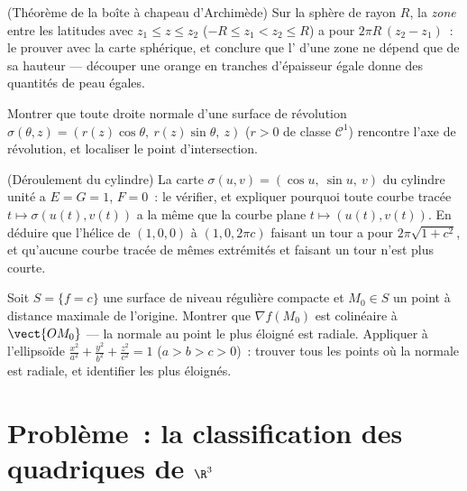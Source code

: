 \begin{exercise}[$\star$]\label{exo:b2:surfaces:9}
(Théorème de la boîte à chapeau d'Archimède) Sur la sphère de
rayon $R$, la \emph{zone} entre les latitudes avec $z_1 \leq z \leq z_2$
($-R \leq z_1 < z_2 \leq R$) a pour  $2\pi R\,(z_2 - z_1)$~:
le prouver avec la carte sphérique, et conclure que l' d'une
zone ne dépend que de sa hauteur --- découper une orange en
tranches d'épaisseur égale donne des quantités de peau égales.
\end{exercise}

\begin{exercise}[$\star\star$]\label{exo:b2:surfaces:10}
Montrer que toute droite normale d'une surface de révolution
$\sigma(\theta, z) = (r(z)\cos\theta,\ r(z)\sin\theta,\ z)$
($r > 0$ de classe $\mathcal C^1$) rencontre l'axe de
révolution, et localiser le point d'intersection.
\end{exercise}

\begin{exercise}[$\star\star$]\label{exo:b2:surfaces:11}
(Déroulement du cylindre) La carte $\sigma(u, v) = (\cos u,\
\sin u,\ v)$ du cylindre unité a $E = G = 1$, $F = 0$~:
le vérifier, et expliquer pourquoi toute courbe tracée $t \mapsto
\sigma(u(t), v(t))$ a la même  que la courbe plane $t
\mapsto (u(t), v(t))$. En déduire que l'hélice de $(1, 0, 0)$
à $(1, 0, 2\pi c)$ faisant un tour a pour 
$2\pi\sqrt{1 + c^2}$, et qu'aucune courbe tracée de mêmes
extrémités et faisant un tour  n'est plus courte.
\end{exercise}

\begin{exercise}[$\star\star\star$]\label{exo:b2:surfaces:12}
Soit $S = \{f = c\}$ une surface de niveau régulière compacte et
$M_0 \in S$ un point à distance maximale de l'origine. Montrer
que $\nabla f(M_0)$ est colinéaire à $\vect{OM_0}$ --- la
normale au point le plus éloigné est radiale. Appliquer à
l'ellipsoïde $\frac{x^2}{a^2} + \frac{y^2}{b^2} + \frac{z^2}{c^2} = 1$ ($a >
b > c > 0$)~: trouver tous les points où la normale est radiale, et
identifier les plus éloignés.
\end{exercise}

\section{Problème~: la classification des quadriques de
$\R^3$}

